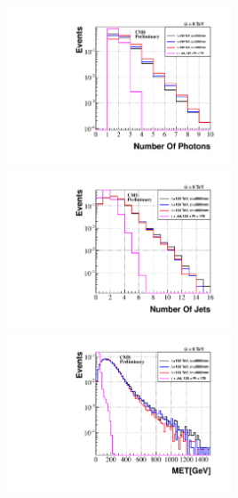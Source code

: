 \begin{minipage}{0.90\linewidth} 
\begin{center}
\centering
\mbox{\includegraphics[height=0.5\textwidth,width=0.5\textwidth]{THESISPLOTS/GMSB-SPS8-MODEL-NumberOfPhotons_Lambda-180-TeV.pdf}%
\includegraphics[height=0.5\textwidth,width=0.5\textwidth]{THESISPLOTS/GMSB-SPS8-MODEL-NumberOfJets_Lambda-180-TeV.pdf}} \\
\hspace{0.5cm}
\mbox{\includegraphics[height=0.5\textwidth,width=0.5\textwidth]{THESISPLOTS/GMSB-SPS8-MODEL-Event-MET_Lambda-180-TeV.pdf}}
\label{fig:NKINE}
\end{center}
\end{minipage}

